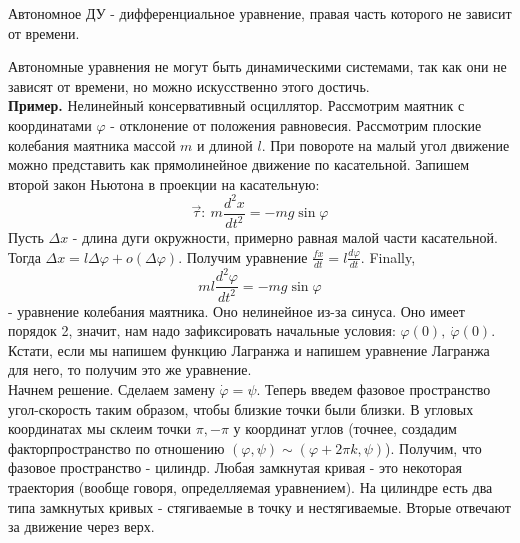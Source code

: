 \begin{defin}
Автономное ДУ - дифференциальное уравнение, правая часть которого не зависит
от времени.
\end{defin}
Автономные уравнения не могут быть динамическими системами, так как они 
не зависят от времени, но можно искусственно этого достичь.\\
\textbf{Пример.} Нелинейный консервативный
осциллятор. Рассмотрим маятник с координатами
$\varphi$ - отклонение от положения равновесия. Рассмотрим плоские
колебания маятника массой $m$ и длиной $l$. При повороте на малый угол 
движение можно представить как прямолинейное движение по касательной.
Запишем второй закон Ньютона в проекции на касательную: 
$$\vec\tau:~m\frac{d^2x}{dt^2}=-mg\sin\varphi$$ 
Пусть $\Delta x$ - длина дуги окружности, примерно равная малой части 
касательной. Тогда  $\Delta x=l\Delta\varphi+o(\Delta\varphi)$.
Получим уравнение
$\frac{fx}{dt}=l \frac{d\varphi}{dt}$. Finally,
$$ml \frac{d^2\varphi}{dt^2}=-mg\sin\varphi$$ 
- уравнение колебания маятника. Оно нелинейное из-за синуса. 
Оно имеет порядок 2, значит, нам надо
зафиксировать начальные условия: $\varphi(0),~\dot\varphi(0)$.
Кстати, если мы напишем функцию Лагранжа и напишем уравнение Лагранжа для
него, то получим это же уравнение.\\
Начнем решение. Сделаем замену $\dot\varphi=\psi$. Теперь введем фазовое 
пространство угол-скорость таким образом, чтобы близкие точки были близки.
В угловых координатах мы склеим точки $\pi,-\pi$ у координат углов (точнее,
создадим факторпространство по отношению $(\varphi,\psi)\sim(\varphi+2\pi k,
\psi)$). Получим, что фазовое пространство - цилиндр. Любая замкнутая кривая - это некоторая траектория (вообще говоря, определляемая уравнением).
На цилиндре есть два типа замкнутых кривых - стягиваемые в точку и 
нестягиваемые. Вторые отвечают за движение через верх. 







